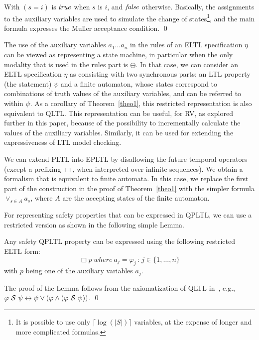 

\noindent
With $(s=i)$ is $\mathit{true}$ when $s$ is $i$, and $\mathit{false}$ otherwise.
Basically, the assignments to the auxiliary variables are used to simulate the change of states\footnote{It is possible to use only $\lceil \log ( | S | ) \rceil$
variables, at the expense of longer and more complicated formulas.}, and the main formula expresses the Muller acceptance condition. \qed

The use of the auxiliary variables $a_1 \ldots a_n$ in the
rules of an ELTL specification 
$\eta$ can be viewed as representing a
state machine, in particular when the only modality that is used in the rules part is $\ominus$.
In that case, we can consider an ELTL specification $\eta$ as consisting with two synchronous parts: an LTL property 
(the statement) $\psi$
and a finite automaton, whose states correspond to combinations
of truth values of the auxiliary variables, and can be referred to
within $\psi$. As a corollary of Theorem~\ref{theo1}, 
this restricted representation is also equivalent to QLTL.
This representation can be useful, for RV, as explored further in this paper, because of the possibility to
incrementally calculate the values of the auxiliary variables. 
Similarly, it can be
used for extending the expressiveness of LTL model checking.


We can extend PLTL into EPLTL by disallowing the future temporal operators (except a prefixing $\Box$, when interpreted over infinite sequences). We obtain
a formalism that is equivalent to finite automata. In this case, 
we replace the first part of the construction in the proof of Theorem~\ref{theo1}
with the simpler formula $\vee_{s \in A} a_s$, where $A$ are the accepting states of the finite automaton.


For representing safety properties that can be expressed in QPLTL, we can use a restricted version as shown in the following simple Lemma.
\begin{lemma}
\label{simplecase}
Any safety QPLTL property can be expressed using the following restricted
ELTL form:
\[  \Box p {\ where\ } a_j  = \varphi_j \, : \, 
 {j \in \{1, \ldots , n\}}  \] 
 with $p$ being one of the auxiliary variables $a_j$.
\end{lemma}
 The proof of the Lemma follows from the
axiomatization of QLTL in~\cite{MP}, e.g.,
$\varphi\ {\cal S}\ \psi \leftrightarrow \psi \vee ( \varphi \wedge (\varphi\ {\cal S}\ \psi))$. \qed

